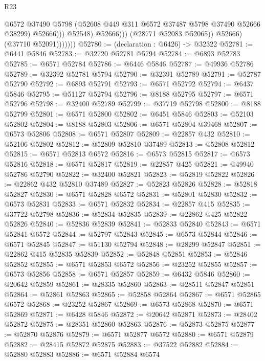 \begin{lexlean}{R23}
\begin{coremodule}
                                  @6572
                                  @37490
                                  @5798
                                  (@52608 @449 @311 @6572 @37487 @5798 @37490 @52666 @38299)
                                  @52666)))
                            @52548)
                          @52666)))
                    (@28771 @52083 @52065))
                  @52666)
                (@37710 @52091)))))))
@52780 := (declaration : @6426) -> @32322
@52781 := @6441 @5846
@52783 := @32720 @52781 @5794
@52784 := @6893 @52783
@52785 := @6571 @52784
@52786 := @6446 @5846
@52787 := @49936 @52786
@52789 := @32392 @52781 @5794
@52790 := @32391 @52789
@52791 := @52787 @52790
@52792 := @6893 @52791
@52793 := @6571 @52792
@52794 := @6437 @5846
@52795 := @51127 @52794
@52796 := @8188 @52795
@52797 := @6571 @52796
@52798 := @32400 @52789
@52799 := @37719 @52798
@52800 := @8188 @52799
@52801 := @6571 @52800
@52802 := @6451 @5846
@52803 := @52103 @52802
@52804 := @8188 @52803
@52806 := @6571 @52804 @39468
@52807 := @6573 @52806
@52808 := @6571 @52807
@52809 := @22857 @432
@52810 := @52106 @52802
@52812 := @52809 @52810 @37489
@52813 := @52808 @52812
@52815 := @6571 @52813 @6572
@52816 := @6573 @52815
@52817 := @6573 @52816
@52818 := @6571 @52817
@52819 := @22857 @425
@52821 := @49940 @52786 @52790
@52822 := @32400 @52821
@52823 := @52819 @52822
@52826 := @22862 @432 @52810 @37489
@52827 := @52823 @52826
@52828 := @52818 @52827
@52830 := @6571 @52828 @6572
@52831 := @52801 @52830
@52832 := @6573 @52831
@52833 := @6571 @52832
@52834 := @22857 @415
@52835 := @37722 @52798
@52836 := @52834 @52835
@52839 := @22862 @425 @52822 @52826
@52840 := @52836 @52839
@52841 := @52833 @52840
@52843 := @6571 @52841 @6572
@52844 := @52797 @52843
@52845 := @6573 @52844
@52846 := @6571 @52845
@52847 := @51130 @52794
@52848 := @28299 @52847
@52851 := @22862 @415 @52835 @52839
@52852 := @52848 @52851
@52853 := @52846 @52852
@52855 := @6571 @52853 @6572
@52856 := @23252 @52855
@52857 := @6573 @52856
@52858 := @6571 @52857
@52859 := @6432 @5846
@52860 := @20642 @52859
@52861 := @28335 @52860
@52863 := @28511 @52847 @52851
@52864 := @52861 @52863
@52865 := @52858 @52864
@52867 := @6571 @52865 @6572
@52868 := @23252 @52867
@52869 := @6573 @52868
@52870 := @6571 @52869
@52871 := @6428 @5846
@52872 := @20642 @52871
@52873 := @28402 @52872
@52875 := @28351 @52860 @52863
@52876 := @52873 @52875
@52877 := @52870 @52876
@52879 := @6571 @52877 @6572
@52880 := @6571 @52879
@52882 := @28415 @52872 @52875
@52883 := @37522 @52882
@52884 := @52880 @52883
@52886 := @6571 @52884 @6574

\end{coremodule}
\end{lexlean}
